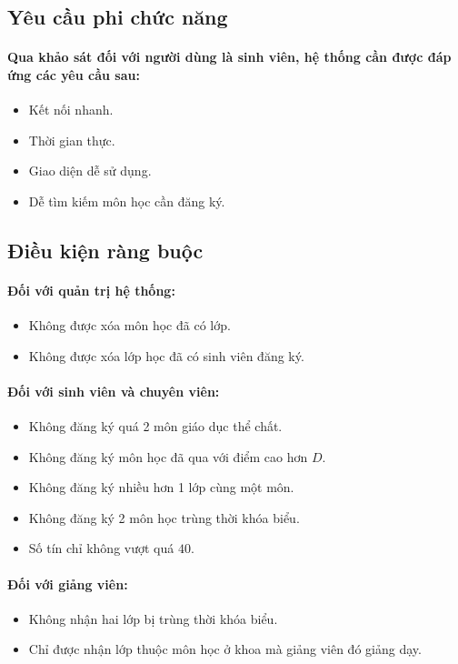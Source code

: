 \documentclass[12pt]{article}
\begin{document}
  \subsection{Yêu cầu phi chức năng}
    \paragraph{
      \textnormal{
        Qua khảo sát đối với người dùng là sinh viên, hệ thống cần được đáp ứng các yêu cầu sau:
      }
    }
    \begin{itemize}
      \item Kết nối nhanh.
      \item Thời gian thực.
      \item Giao diện dễ sử dụng.
      \item Dễ tìm kiếm môn học cần đăng ký.
    \end{itemize}
  
  \subsection{Điều kiện ràng buộc}
    \paragraph{Đối với quản trị hệ thống:}
    \begin{itemize}
      \item Không được xóa môn học đã có lớp.
      \item Không được xóa lớp học đã có sinh viên đăng ký.
    \end{itemize}

    \paragraph{Đối với sinh viên và chuyên viên:}
    \begin{itemize}
      \item Không đăng ký quá 2 môn giáo dục thể chất.
      \item Không đăng ký môn học đã qua với điểm cao hơn $ D $.
      \item Không đăng ký nhiều hơn 1 lớp cùng một môn.
      \item Không đăng ký 2 môn học trùng thời khóa biểu.
      \item Số tín chỉ không vượt quá $ 40 $.
    \end{itemize}

    \paragraph{Đối với giảng viên:}
    \begin{itemize}
      \item Không nhận hai lớp bị trùng thời khóa biểu.
      \item Chỉ được nhận lớp thuộc môn học ở khoa mà giảng viên đó giảng dạy.
    \end{itemize}
\end{document}
